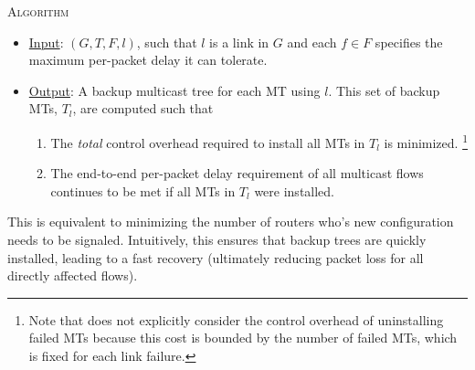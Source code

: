 \mc \textsc{Algorithm}
\begin{itemize}

	\item  \underline{Input}: $(G,T,F,l)$, such that $l$ is a link in $G$ and each $f \in F$ specifies the maximum per-packet delay it can tolerate.

	\item \underline{Output}: 	A backup multicast tree for each MT using $l$. This set of backup MTs, $T_l$, are computed such that 
	
	\begin{enumerate}
			
		\item The \emph{total} control overhead required to install all MTs in $T_l$ is minimized.
	\footnote{Note that \mc does not explicitly consider the control overhead of uninstalling failed MTs because this cost is bounded by the number of failed MTs, which is fixed for each link failure.}
			
			\item The end-to-end per-packet delay requirement of all multicast flows continues to be met if all MTs in $T_l$ were installed. 
		\end{enumerate}



\end{itemize}
This is equivalent to minimizing the number of routers who's new configuration needs to be signaled.
Intuitively, this ensures that backup trees are quickly installed, leading to a fast recovery (ultimately reducing packet loss for all directly affected flows).  





















